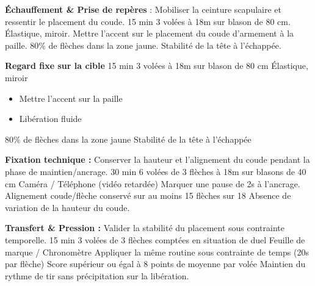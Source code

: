 \documentclass{../tex/ficheseance}
\begin{document}
	\makeficheheader

	\begin{tableauSeance}

		\ligneSeance
		{\textbf{Échauffement \& Prise de repères} : Mobiliser la ceinture scapulaire et ressentir le placement du coude.} %
		{15 min} %
		{3 volées à 18m sur blason de 80 cm.} %
		{Élastique, miroir.}         %
		{Mettre l'accent sur le placement du coude d'armement à la paille.}              %
		{80\% de flèches dans la zone jaune.} %
		{Stabilité de la tête à l'échappée.}  %

		\ligneSeance
		{\textbf{Regard fixe sur la cible}}
		{15 min}
		{3 volées à 18m sur blason de 80 cm}
		{Élastique, miroir}
		{\begin{itemize}
				\item Mettre l'accent sur la paille
				\item Libération fluide
		\end{itemize}}              %
		{80\% de flèches dans la zone jaune}
		{Stabilité de la tête à l'échappée}

		\ligneSeance
		{\textbf{Fixation technique :} Conserver la hauteur et l'alignement du coude pendant la phase de maintien/ancrage.}
		{30 min}
		{6 volées de 3 flèches à 18m sur blasons de 40 cm}
		{Caméra / Téléphone (vidéo retardée)}
		{Marquer une pause de 2s à l'ancrage.}
		{Alignement coude/flèche conservé sur au moins 15 flèches sur 18}
		{Absence de variation de la hauteur du coude.}

		\ligneSeance
		{\textbf{Transfert \& Pression :} Valider la stabilité du placement sous contrainte temporelle.}
		{15 min}
		{3 volées de 3 flèches comptées en situation de duel}
		{Feuille de marque / Chronomètre}
		{Appliquer la même routine sous contrainte de temps (20s par flèche)}
		{Score supérieur ou égal à 8 points de moyenne par volée}
		{Maintien du rythme de tir sans précipitation sur la libération.}

	\end{tableauSeance}
\end{document}
